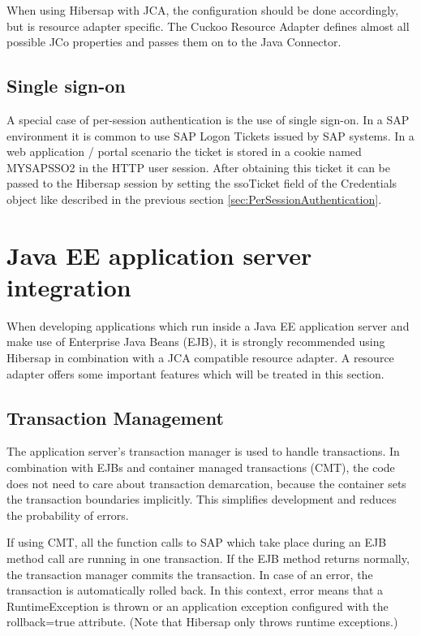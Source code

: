 When using Hibersap with JCA, the configuration should be done accordingly, but is resource adapter specific. The Cuckoo Resource Adapter defines almost all possible JCo properties and passes them on to the Java Connector.


\subsection{Single sign-on}
\label{sec:SingleSignOn}

A special case of per-session authentication is the use of single sign-on. In a SAP environment it is common to use SAP Logon Tickets issued by SAP systems. In a web application / portal scenario the ticket is stored in a cookie named MYSAPSSO2 in the HTTP user session. After obtaining this ticket it can be passed to the Hibersap session by setting the ssoTicket field of the Credentials object like described in the previous section \ref{sec:PerSessionAuthentication}.

\section{Java EE application server integration}
\label{sec:JavaEEIntegration}
When developing applications which run inside a Java EE application server and make use of Enterprise Java Beans (EJB), it is 
strongly recommended using Hibersap in combination with a JCA compatible resource adapter. A resource adapter offers some important features which will be treated in this section.

\subsection{Transaction Management} 
The application server's transaction manager is used to handle transactions. In combination with EJBs and container managed transactions (CMT), the code does not need to care about transaction demarcation, because the container sets the transaction boundaries implicitly. This simplifies development and reduces the probability of errors. 

If using CMT, all the function calls to SAP which take place during an EJB method call are running in one transaction. If the EJB method returns normally, the transaction manager commits the transaction. In case of an error, the transaction is automatically rolled back. In this context, error means that a RuntimeException is thrown or an application exception configured with the rollback=true attribute. (Note that Hibersap only throws runtime exceptions.)

